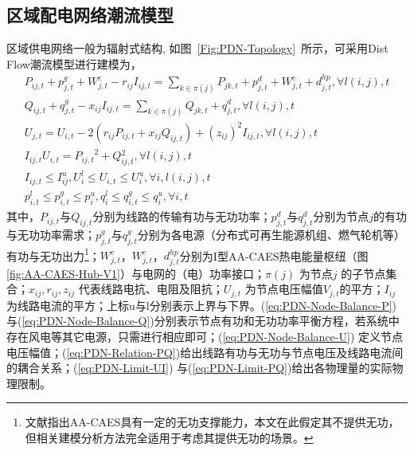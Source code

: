\subsection{区域配电网络潮流模型}
\label{sec:st-case-dispatch-PDN}
区域供电网络一般为辐射式结构, 如图~\ref{Fig:PDN-Topology}~所示，可采用Dist Flow潮流模型进行建模为\cite{Distflow-WFL, Branchflow-SH1}，
\begin{subequations}
\label{eq:PDN-Branch-Flow-All}
\begin{gather}
P_{ij,t} + p_{j,t}^g + W_{j,t}^e - r_{ij}I_{ij,t} = \sum\limits_{k \in \pi(j)} {P_{jk,t}}+ p_{j,t}^d +  W_{j,t}^c + d_{j,t}^{hp},\forall l({i,j}),t \label{eq:PDN-Node-Balance-P}\\
Q_{ij,t} + q_{j,t}^g - x_{ij}I_{ij,t} = \sum\limits_{k \in \pi(j)} {{Q_{jk,t}}}+ q_{j,t}^d,\forall l({i,j}),t \label{eq:PDN-Node-Balance-Q}\\
{U_{j,t}} = {U_{i,t}}-2({{r_{ij}}P_{ij,t} + x_{ij}{Q_{ij,t}}}) + {({{z_{ij}}})^2}{I_{ij,t}},\forall l({i,j}),t \label{eq:PDN-Node-Balance-U}\\
{I_{ij,t}}{U_{i,t}} = {P_{ij,t}}^2 + Q{_{ij,t}^2},\forall l({i,j}),t \label{eq:PDN-Relation-PQ}\\
I_{ij,t} \le I_{ij}^u,U_i^l \le {U_{i,t}} \le U_i^u,\forall i,l({i,j}),t \label{eq:PDN-Limit-UI}\\
p_{i,t}^l \le p_{i,t}^g \le p_i^u,q_i^l \le q_{i,t}^g \le q_i^u,\forall i,t \label{eq:PDN-Limit-PQ}
\end{gather}
\end{subequations}
其中，$P_{ij,t}$与${Q_{ij,t}}$分别为线路的传输有功与无功功率；$p_{j,t}^d$与$q_{j,t}^d$分别为节点$j$的有功与无功功率需求；$p_{j,t}^g$与$q_{j,t}^g$分别为各电源（分布式可再生能源机组、燃气轮机等）有功与无功出力\footnote{文献指出AA-CAES具有一定的无功支撑能力，本文在此假定其不提供无功，但相关建模分析方法完全适用于考虑其提供无功的场景。}；$W_{j,t}^e$，$W_{j,t}^c$，$d_{j,t}^{hp}$分别为I型AA-CAES热电能量枢纽（图
\ref{fig:AA-CAES-Hub-V1}）与电网的（电）功率接口；$\pi(j)$ 为节点$j$ 的子节点集合；${x_{ij}},{r_{ij}},{z_{ij}}$ 代表线路电抗、电阻及阻抗；${U_{j,t}}$ 为节点电压幅值$V_{j,t}$的平方；${I_{ij}}$ 为线路电流的平方；上标u与l分别表示上界与下界。(\ref{eq:PDN-Node-Balance-P})与(\ref{eq:PDN-Node-Balance-Q})分别表示节点有功和无功功率平衡方程，若系统中存在风电等其它电源，只需进行相应即可；(\ref{eq:PDN-Node-Balance-U}) 定义节点电压幅值；(\ref{eq:PDN-Relation-PQ})给出线路有功与无功与节点电压及线路电流间的耦合关系；(\ref{eq:PDN-Limit-UI}) 与(\ref{eq:PDN-Limit-PQ})给出各物理量的实际物理限制。

